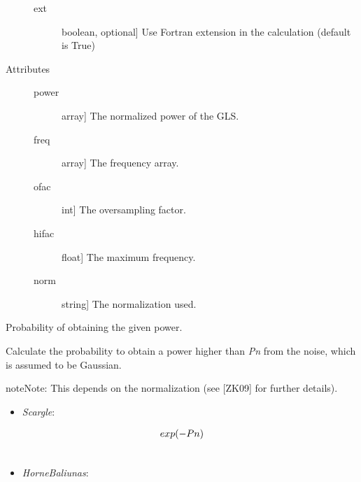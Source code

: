 \documentclass[letterpaper,10pt,english]{sphinxmanual}
\begin{document}
\begin{fulllineitems}
\begin{description}
\begin{description}
\item[{ext}] \leavevmode{[}boolean, optional{]}
Use Fortran extension in the calculation (default is True)

\end{description}

\item[{Attributes}] \leavevmode\begin{description}
\item[{power}] \leavevmode{[}array{]}
The normalized power of the GLS.

\item[{freq}] \leavevmode{[}array{]}
The frequency array.

\item[{ofac}] \leavevmode{[}int{]}
The oversampling factor.

\item[{hifac}] \leavevmode{[}float{]}
The maximum frequency.

\item[{norm}] \leavevmode{[}string{]}
The normalization used.

\end{description}

\end{description}

\begin{fulllineitems}
\label{api:OPEN.periodograms.gls.prob}
Probability of obtaining the given power.

Calculate the probability to obtain a power higher than
\emph{Pn} from the noise, which is assumed to be Gaussian.

\begin{notice}{note}{Note:}
This depends on the normalization
(see {[}ZK09{]} for further details).
\begin{itemize}
\item {} 
\emph{Scargle}:

\end{itemize}
\begin{gather}
\begin{split}exp(-Pn)\end{split}\notag\\\begin{split}\end{split}\notag
\end{gather}\begin{itemize}
\item {} 
\emph{HorneBaliunas}:


\end{itemize}
\end{notice}
\end{fulllineitems}
\end{fulllineitems}
\end{document}

